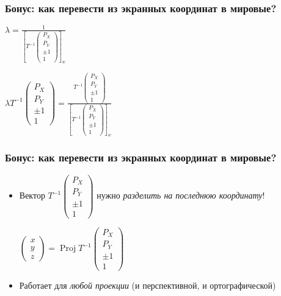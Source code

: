 \documentclass[10pt]{beamer}
\begin{document}
\begin{frame}[fragile]
\frametitle{Бонус: как перевести из экранных координат в мировые?}
\begin{center}
\begin{math}
\lambda =
\frac{1}{
\left[
T^{-1} \begin{pmatrix}P_X \\ P_Y \\ \pm 1 \\ 1\end{pmatrix}
\right]_w}
\end{math}
\end{center}
\pause
\begin{center}
\begin{math}
\lambda T^{-1} \begin{pmatrix}P_X \\ P_Y \\ \pm 1 \\ 1\end{pmatrix} = \frac{T^{-1} \begin{pmatrix}P_X \\ P_Y \\ \pm 1 \\ 1\end{pmatrix}}{\left[
T^{-1} \begin{pmatrix}P_X \\ P_Y \\ \pm 1 \\ 1\end{pmatrix}
\right]_w}
\end{math}
\end{center}
\end{frame}

\begin{frame}[fragile]
\frametitle{Бонус: как перевести из экранных координат в мировые?}
\begin{itemize}
\item Вектор \begin{math}T^{-1}\begin{pmatrix}P_X \\ P_Y \\ \pm 1 \\ 1\end{pmatrix}\end{math} нужно \textit{разделить на последнюю координату}!
\pause
\begin{center}
\begin{math}
\begin{pmatrix}x \\ y \\ z\end{pmatrix} =
\operatorname{Proj} T^{-1} \begin{pmatrix}P_X \\ P_Y \\ \pm 1 \\ 1\end{pmatrix}
\end{math}
\end{center}
\pause
\item Работает для \textit{любой проекции} (и перспективной, и ортографической)
\end{itemize}
\end{frame}
\end{document}

